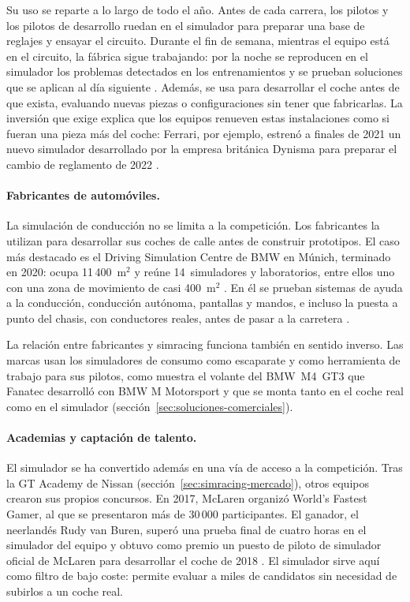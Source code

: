 Su uso se reparte a lo largo de todo el año. Antes de cada carrera, los pilotos y los pilotos de desarrollo ruedan en el simulador para preparar una base de reglajes y ensayar el circuito. Durante el fin de semana, mientras el equipo está en el circuito, la fábrica sigue trabajando: por la noche se
reproducen en el simulador los problemas detectados en los entrenamientos y se prueban soluciones que se aplican al día siguiente \parencite{mercedes_sim_driver}. Además, se usa para desarrollar el coche antes de que exista, evaluando nuevas piezas o configuraciones sin tener que fabricarlas. La inversión que exige
explica que los equipos renueven estas instalaciones como si fueran una pieza más del coche: Ferrari, por ejemplo, estrenó a finales de 2021 un nuevo simulador desarrollado por la empresa británica Dynisma para preparar el cambio de reglamento de 2022 \parencite{ferrari_2021_simulator}.

\paragraph{Fabricantes de automóviles.}
La simulación de conducción no se limita a la competición. Los fabricantes la utilizan para desarrollar sus coches de calle antes de construir prototipos. El caso más destacado es el Driving Simulation Centre de BMW en Múnich, terminado en 2020: ocupa 11\,400~m$^2$ y reúne 14~simuladores y
laboratorios, entre ellos uno con una zona de movimiento de casi 400~m$^2$ \parencite{bmw_2020_dsc}. En él se prueban sistemas de ayuda a la conducción, conducción autónoma, pantallas y mandos, e incluso la puesta a punto del chasis, con conductores reales, antes de pasar a la carretera \parencite{bmw_2020_dsc}.

La relación entre fabricantes y simracing funciona también en sentido inverso. Las marcas usan los simuladores de consumo como escaparate y como herramienta de trabajo para sus pilotos, como muestra el volante del BMW~M4~GT3 que Fanatec desarrolló con BMW M Motorsport y que se monta tanto en el coche real
como en el simulador (sección~\ref{sec:soluciones-comerciales}).

\paragraph{Academias y captación de talento.}
El simulador se ha convertido además en una vía de acceso a la competición. Tras la GT Academy de Nissan (sección~\ref{sec:simracing-mercado}), otros equipos crearon sus propios concursos. En 2017, McLaren organizó World's Fastest Gamer, al que se presentaron más de 30\,000 participantes. El ganador,
el neerlandés Rudy van Buren, superó una prueba final de cuatro horas en el simulador del equipo y obtuvo como premio un puesto de piloto de simulador oficial de McLaren para desarrollar el coche de 2018 \parencite{mclaren_2017_wfg}. El simulador sirve aquí como filtro de bajo coste: permite evaluar a miles de
candidatos sin necesidad de subirlos a un coche real.

